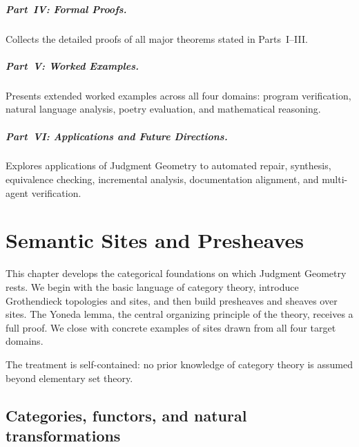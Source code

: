 \paragraph{Part~IV: Formal Proofs.}
Collects the detailed proofs of all major theorems stated in
Parts~I--III.

\paragraph{Part~V: Worked Examples.}
Presents extended worked examples across all four domains: program
verification, natural language analysis, poetry evaluation, and
mathematical reasoning.

\paragraph{Part~VI: Applications and Future Directions.}
Explores applications of Judgment Geometry to automated repair,
synthesis, equivalence checking, incremental analysis, documentation
alignment, and multi-agent verification.

\chapter{Semantic Sites and Presheaves}
\label{ch:sites}

This chapter develops the categorical foundations on which Judgment
Geometry rests.  We begin with the basic language of category theory,
introduce Grothendieck topologies and sites, and then build presheaves
and sheaves over sites.  The Yoneda lemma, the central organizing
principle of the theory, receives a full proof.  We close with
concrete examples of sites drawn from all four target domains.

The treatment is self-contained: no prior knowledge of category theory
is assumed beyond elementary set theory.


\section{Categories, functors, and natural transformations}
\label{sec:sites:categories}

